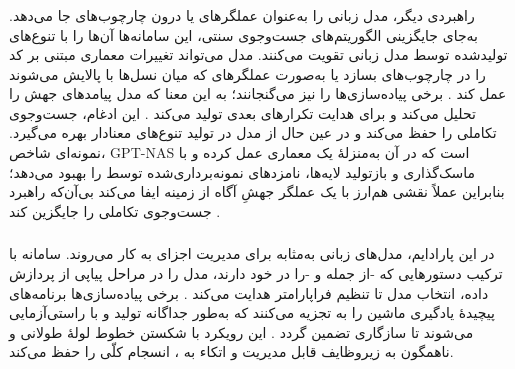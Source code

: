 \subsubsection{\protect{}}
راهبردی دیگر، مدل زبانی را به‌عنوان عملگرهای  یا  درون چارچوب‌های  جا می‌دهد. به‌جای جایگزینی الگوریتم‌های جست‌وجوی سنتی، این سامانه‌ها آن‌ها را با تنوع‌های تولیدشده توسط مدل زبانی تقویت می‌کنند. مدل می‌تواند تغییرات معماری مبتنی بر کد را در چارچوب‌های  بسازد \cite{LLMatic2024} یا به‌صورت عملگرهای  که میان نسل‌ها با  پالایش می‌شوند عمل کند \cite{chen2023Evoprompting}. برخی پیاده‌سازی‌ها  را نیز می‌گنجانند؛ به این معنا که مدل پیامدهای جهش را تحلیل می‌کند و  برای هدایت تکرارهای بعدی تولید می‌کند \cite{ji2025RZNAS}. این ادغام،  جست‌وجوی تکاملی را حفظ می‌کند و در عین حال از  مدل در تولید تنوع‌های معنادار بهره می‌گیرد. نمونه‌ای شاخص، GPT-NAS است که در آن  به‌منزلهٔ یک  معماری عمل کرده و با ماسک‌گذاری و بازتولید لایه‌ها، نامزدهای نمونه‌برداری‌شده توسط  را بهبود می‌دهد؛ بنابراین عملاً نقشی هم‌ارز با یک عملگر جهشِ آگاه از زمینه ایفا می‌کند بی‌آن‌که راهبرد جست‌وجوی تکاملی را جایگزین کند \cite{Yu2025GPTNAS}.

\subsubsection{\protect{}}
در این پارادایم، مدل‌های زبانی به‌مثابه  برای مدیریت اجزای  به کار می‌روند. سامانه با ترکیب دستور‌هایی که -از جمله  و -را در خود دارند، مدل را در مراحل پیاپی از پردازش داده، انتخاب مدل تا تنظیم فراپارامتر هدایت می‌کند \cite{zhang2023AutomlGPTAutomaticMachineLearning, shen2023HuggingGPT}. برخی پیاده‌سازی‌ها برنامه‌های پیچیدهٔ یادگیری ماشین را به  تجزیه می‌کنند که به‌طور جداگانه تولید و با  راستی‌آزمایی می‌شوند تا سازگاری تضمین گردد \cite{xu2024largeTextToML}. این رویکرد با شکستن خطوط لولهٔ طولانی و ناهمگون به زیروظایف قابل مدیریت و اتکاء به ، انسجام کلّی را حفظ می‌کند.
